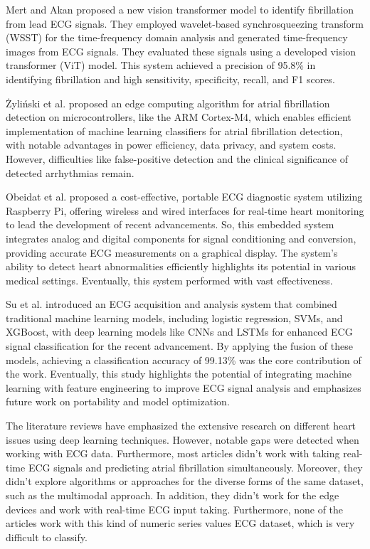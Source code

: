 \documentclass[conference]{IEEEtran}
\begin{document}
Mert and Akan \cite{mert2023time} proposed a new vision transformer model to identify fibrillation from lead ECG signals. They employed wavelet-based synchrosqueezing transform (WSST) for the time-frequency domain analysis and generated time-frequency images from ECG signals. They evaluated these signals using a developed vision transformer (ViT) model. This system achieved a precision of 95.8\% in identifying fibrillation and high sensitivity, specificity, recall, and F1 scores.

Żyliński et al. \cite{zylinski2023design} proposed an edge computing algorithm for atrial fibrillation detection on microcontrollers, like the ARM Cortex-M4, which enables efficient implementation of machine learning classifiers for atrial fibrillation detection, with notable advantages in power efficiency, data privacy, and system costs. However, difficulties like false-positive detection and the clinical significance of detected arrhythmias remain.

Obeidat et al. \cite{obeidat2023embedded} proposed a cost-effective, portable ECG diagnostic system utilizing Raspberry Pi, offering wireless and wired interfaces for real-time heart monitoring to lead the development of recent advancements. So, this embedded system integrates analog and digital components for signal conditioning and conversion, providing accurate ECG measurements on a graphical display. The system's ability to detect heart abnormalities efficiently highlights its potential in various medical settings. Eventually, this system performed with vast effectiveness.

Su et al. \cite{su2023ecg} introduced an ECG acquisition and analysis system that combined traditional machine learning models, including logistic regression, SVMs, and XGBoost, with deep learning models like CNNs and LSTMs for enhanced ECG signal classification for the recent advancement. By applying the fusion of these models, achieving a classification accuracy of 99.13\% was the core contribution of the work. Eventually, this study highlights the potential of integrating machine learning with feature engineering to improve ECG signal analysis and emphasizes future work on portability and model optimization.

The literature reviews have emphasized the extensive research on different heart issues using deep learning techniques. However, notable gaps were detected when working with ECG data. Furthermore, most articles didn't work with taking real-time ECG signals and predicting atrial fibrillation simultaneously. Moreover, they didn't explore algorithms or approaches for the diverse forms of the same dataset, such as the multimodal approach. In addition, they didn't work for the edge devices and work with real-time ECG input taking. Furthermore, none of the articles work with this kind of numeric series values ECG dataset, which is very difficult to classify.
\end{document}

